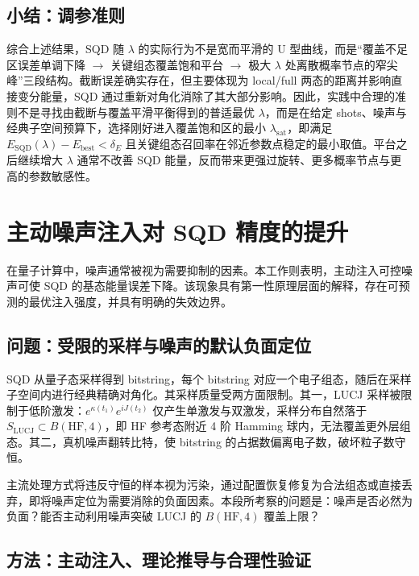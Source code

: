 \documentclass[UTF8,12pt,a4paper]{ctexart}
\begin{document}
\subsection{小结：调参准则}

综合上述结果，SQD 随 $\lambda$ 的实际行为不是宽而平滑的 U 型曲线，而是``覆盖不足区误差单调下降 $\rightarrow$ 关键组态覆盖饱和平台 $\rightarrow$ 极大 $\lambda$ 处离散概率节点的窄尖峰''三段结构。截断误差确实存在，但主要体现为 local/full 两态的距离并影响直接变分能量，SQD 通过重新对角化消除了其大部分影响。因此，实践中合理的准则不是寻找由截断与覆盖平滑平衡得到的普适最优 $\lambda$，而是在给定 shots、噪声与经典子空间预算下，选择刚好进入覆盖饱和区的最小 $\lambda_{\text{sat}}$，即满足 $E_{\text{SQD}}(\lambda)-E_{\text{best}}<\delta_E$ 且关键组态召回率在邻近参数点稳定的最小取值。平台之后继续增大 $\lambda$ 通常不改善 SQD 能量，反而带来更强过旋转、更多概率节点与更高的参数敏感性。

\section{主动噪声注入对 SQD 精度的提升}

在量子计算中，噪声通常被视为需要抑制的因素。本工作则表明，主动注入可控噪声可使 SQD 的基态能量误差下降。该现象具有第一性原理层面的解释，存在可预测的最优注入强度，并具有明确的失效边界。

\subsection{问题：受限的采样与噪声的默认负面定位}

SQD 从量子态采样得到 bitstring，每个 bitstring 对应一个电子组态，随后在采样子空间内进行经典精确对角化。其采样质量受两方面限制。其一，LUCJ 采样被限制于低阶激发：$e^{\kappa(t_1)}e^{iJ(t_2)}$ 仅产生单激发与双激发，采样分布自然落于 $S_{\text{LUCJ}}\subset B(\text{HF},4)$，即 HF 参考态附近 4 阶 Hamming 球内，无法覆盖更外层组态。其二，真机噪声翻转比特，使 bitstring 的占据数偏离电子数，破坏粒子数守恒。

主流处理方式将违反守恒的样本视为污染，通过配置恢复修复为合法组态或直接丢弃，即将噪声定位为需要消除的负面因素。本段所考察的问题是：噪声是否必然为负面？能否主动利用噪声突破 LUCJ 的 $B(\text{HF},4)$ 覆盖上限？

\subsection{方法：主动注入、理论推导与合理性验证}
\end{document}
